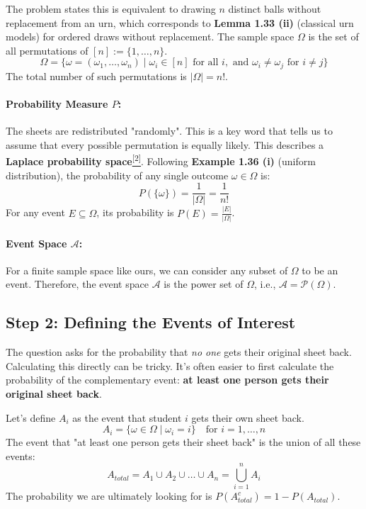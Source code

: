 \documentclass[11pt,a4paper]{article}
\begin{document}
The problem states this is equivalent to drawing $n$ distinct balls without replacement from an urn, which corresponds to \textbf{Lemma 1.33 (ii)} (classical urn models) for ordered draws without replacement.
The sample space $\Omega$ is the set of all permutations of $[n] := \{1, \dots, n\}$.
\[
    \Omega = \{\omega = (\omega_1, \dots, \omega_n) \mid \omega_i \in [n] \text{ for all } i, \text{ and } \omega_i \neq \omega_j \text{ for } i \neq j\}
\]
The total number of such permutations is $|\Omega| = n!$.

\paragraph{Probability Measure $P$:}
The sheets are redistributed "randomly". This is a key word that tells us to assume that every possible permutation is equally likely. This describes a \textbf{Laplace probability space}\hyperlink{note:laplace}{\textsuperscript{[2]}}.
Following \textbf{Example 1.36 (i)} (uniform distribution), the probability of any single outcome $\omega \in \Omega$ is:
\[
    P(\{\omega\}) = \frac{1}{|\Omega|} = \frac{1}{n!}
\]
For any event $E \subseteq \Omega$, its probability is $P(E) = \frac{|E|}{|\Omega|}$.

\paragraph{Event Space $\mathcal{A}$:}
For a finite sample space like ours, we can consider any subset of $\Omega$ to be an event. Therefore, the event space $\mathcal{A}$ is the power set of $\Omega$, i.e., $\mathcal{A} = \mathcal{P}(\Omega)$.

\subsection{Step 2: Defining the Events of Interest}
The question asks for the probability that \textit{no one} gets their original sheet back. Calculating this directly can be tricky. It's often easier to first calculate the probability of the complementary event: \textbf{at least one person gets their original sheet back}.

Let's define $A_i$ as the event that student $i$ gets their own sheet back.
\[
    A_i = \{\omega \in \Omega \mid \omega_i = i\} \quad \text{for } i = 1, \dots, n
\]
The event that "at least one person gets their sheet back" is the union of all these events:
\[
    A_{total} = A_1 \cup A_2 \cup \dots \cup A_n = \bigcup_{i=1}^n A_i
\]
The probability we are ultimately looking for is $P(A_{total}^c) = 1 - P(A_{total})$.
\end{document}
